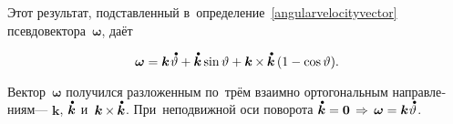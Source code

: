 \begin{otherlanguage}{russian}
Этот результат, подставленный в~определение~\eqref{angularvelocityvector} псевдо\-вектора~$\bm{\omega}$, даёт

\nopagebreak\vspace{-0.5em}\begin{equation}
\bm{\omega} = \bm{k} \hspace{0.2ex} \mathdotabove{\vartheta}
+ \mathdotabove{\bm{k}} \operatorname{sin} \vartheta
+ \bm{k} \hspace{-0.1ex}\times\hspace{-0.1ex} \mathdotabove{\bm{k}} \left( 1 - \operatorname{cos} \vartheta \right) \hspace{-0.4ex}.
\end{equation}

\vspace{-0.32em} \noindent Вектор~$\bm{\omega}$ получился разложенным по~трём взаимно ортогональным направлениям\:--- $\bm{k}$, $\mathdotabove{\bm{k}}$ и~${\bm{k} \hspace{-0.1ex}\times\hspace{-0.1ex} \mathdotabove{\bm{k}}}$. При~неподвижной оси поворота ${\mathdotabove{\bm{k}} = \bm{0} \,\Rightarrow\, \bm{\omega} = \bm{k} \hspace{0.1ex} \mathdotabove{\vartheta}}$.


\end{otherlanguage}
